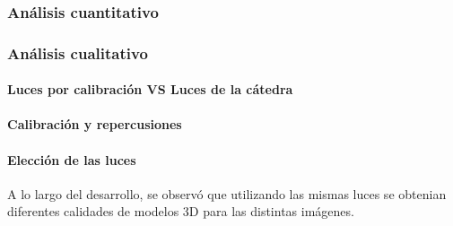 \subsubsection{Análisis cuantitativo}



\subsubsection{Análisis cualitativo}

\paragraph{Luces por calibración VS Luces de la cátedra}

\paragraph{Calibración y repercusiones}

\paragraph{Elección de las luces}

A lo largo del desarrollo, se observó que utilizando las mismas luces se obtenian diferentes calidades de modelos 3D para las distintas imágenes.
